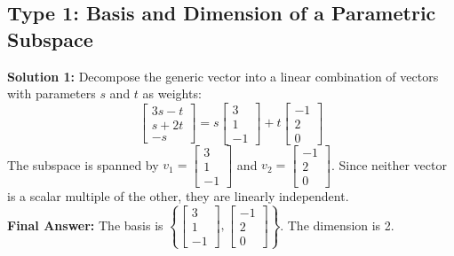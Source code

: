 \documentclass{article}
\begin{document}
\subsection*{Type 1: Basis and Dimension of a Parametric Subspace}
\textbf{Solution 1:} 
Decompose the generic vector into a linear combination of vectors with parameters $s$ and $t$ as weights:
$$ \begin{bmatrix} 3s - t \\ s + 2t \\ -s \end{bmatrix} = s \begin{bmatrix} 3 \\ 1 \\ -1 \end{bmatrix} + t \begin{bmatrix} -1 \\ 2 \\ 0 \end{bmatrix} $$
The subspace is spanned by $v_1 = \begin{bmatrix} 3 \\ 1 \\ -1 \end{bmatrix}$ and $v_2 = \begin{bmatrix} -1 \\ 2 \\ 0 \end{bmatrix}$. Since neither vector is a scalar multiple of the other, they are linearly independent. \\
\textbf{Final Answer:} The basis is $\left\{ \begin{bmatrix} 3 \\ 1 \\ -1 \end{bmatrix}, \begin{bmatrix} -1 \\ 2 \\ 0 \end{bmatrix} \right\}$. The dimension is 2. \\
\end{document}
